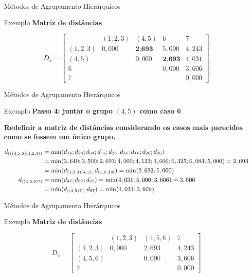 \documentclass[
  ignorenonframetext,
  aspectratio=169,
]{beamer}
\begin{document}
\begin{frame}{Métodos de Agrupamento Hierárquicos}
\protect{}\label{muxe9todos-de-agrupamento-hieruxe1rquicos-24}
\begin{block}{Exemplo}
\protect{}\label{exemplo-13}
\textbf{Matriz de distâncias}

\[D_3 = \left[ \begin{matrix}
&(1,2,3) &(4,5)&6&7\\ 
(1,2,3)& 0,000 & \textbf{2,693} & 5,000 & 4,243 \\
(4,5)    &  & 0,000 &  \textbf{2,693} & 4,031 \\
6  &     &  & 0,000 & 3,606 \\
7  &      &  &  & 0,000
                    \end{matrix} \right]\]
\end{block}
\end{frame}

\begin{frame}{Métodos de Agrupamento Hierárquicos}
\protect{}\label{muxe9todos-de-agrupamento-hieruxe1rquicos-25}
\begin{block}{Exemplo}
\protect{}\label{exemplo-14}
\textbf{Passo 4: juntar o grupo \((4,5)\) como caso 6}

\textbf{Redefinir a matriz de distâncias considerando os casos mais
parecidos como se fossem um único grupo.}

\[ \small
\begin{aligned}
d_{(((4,5,6)(1,2,3))} &=  \min(d_{14};d_{24};d_{34};d_{15};d_{25};d_{35};d_{16};d_{26};d_{36}) \\ 
&= \min(3,640; 3,500; 2,693; 4,000; 4,123; 3,606; 6,325; 6,083; 5,000) = 2,693 \\ &= 
\min(d_{(1,2,3)(4,5)};d_{(1,2,3)6}) = \min(2,693; 5,000) \\
d_{((4,5,6)7)} &= \min(d_{47};d_{57};d_{67}) =  \min(4,031; 5,000; 3,606) = 3,606 \\ &=  \min(d_{((4,5)7)};d_{67}) = \min(4,031;3,606) \\ 
\end{aligned}
\]
\end{block}
\end{frame}

\begin{frame}{Métodos de Agrupamento Hierárquicos}
\protect{}\label{muxe9todos-de-agrupamento-hieruxe1rquicos-26}
\begin{block}{Exemplo}
\protect{}\label{exemplo-15}
\textbf{Matriz de distâncias}

\[D_4 = \left[ \begin{matrix}
&(1,2,3) &(4,5,6) &7\\ 
(1,2,3)& 0,000 & 2,693 &  4,243 \\
(4,5,6)    &  & 0,000 &  3,606 \\
7  &       &  & 0,000
                    \end{matrix} \right]\]
\end{block}
\end{frame}
\end{document}
